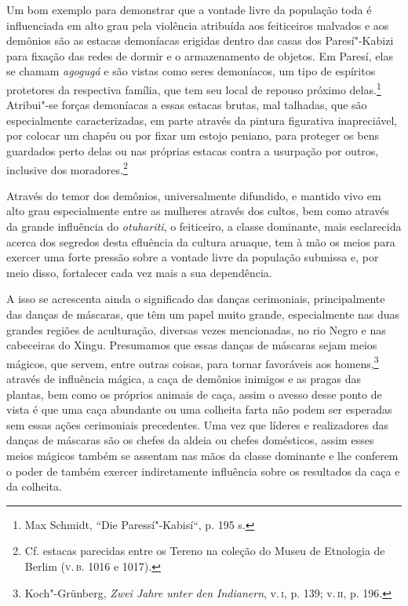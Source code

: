 Um bom exemplo para demonstrar que a vontade livre da população toda é
influenciada em alto grau pela violência atribuída aos feiticeiros
malvados e aos demônios são as estacas demoníacas erigidas dentro das
casas dos Paresí"-Kabizi para fixação das redes de dormir e o
armazenamento de objetos. Em Paresí, elas se chamam \emph{agogugá} e são
vistas como seres demoníacos, um tipo de espíritos protetores da
respectiva família, que tem seu local de repouso próximo delas.\footnote{Max
  Schmidt, ``Die Paressí"-Kabisí``, p. 195 s.} Atribui"-se forças
demoníacas a essas estacas brutas, mal talhadas, que são especialmente
caracterizadas, em parte através da pintura figurativa inapreciável, por
colocar um chapéu ou por fixar um estojo peniano, para proteger os bens
guardados perto delas ou nas próprias estacas contra a usurpação por
outros, inclusive dos moradores.\footnote{Cf. estacas parecidas entre os
  Tereno na coleção do Museu de Etnologia de Berlim (\textsc{v.\,b.} 1016 e 1017).}


Através do temor dos demônios, universalmente difundido, e mantido vivo
em alto grau especialmente entre as mulheres através dos cultos, bem
como através da grande influência do \emph{otuhariti}, o feiticeiro, a
classe dominante, mais esclarecida acerca dos segredos desta efluência
da cultura aruaque, tem à mão os meios para exercer uma forte pressão
sobre a vontade livre da população submissa e, por meio disso,
fortalecer cada vez mais a sua dependência.

A isso se acrescenta ainda o significado das danças cerimoniais,
principalmente das danças de máscaras, que têm um papel muito grande,
especialmente nas duas grandes regiões de aculturação, diversas vezes
mencionadas, no rio Negro e nas cabeceiras do Xingu. Presumamos que
essas danças de máscaras sejam meios mágicos, que servem, entre outras
coisas, para tornar favoráveis aos homens,\footnote{Koch"-Grünberg,
  \emph{Zwei Jahre unter den Indianern}, v.\,\textsc{i}, p. 139; v.\,\textsc{ii}, p. 196.}
através de influência mágica, a caça de demônios inimigos e as pragas
das plantas, bem como os próprios animais de caça, assim o avesso desse
ponto de vista é que uma caça abundante ou uma colheita farta não podem
ser esperadas sem essas ações cerimoniais precedentes. Uma vez que
líderes e realizadores das danças de máscaras são os chefes da aldeia ou
chefes domésticos, assim esses meios mágicos também se assentam nas
mãos da classe dominante e lhe conferem o poder de também exercer
indiretamente influência sobre os resultados da caça e da colheita.

